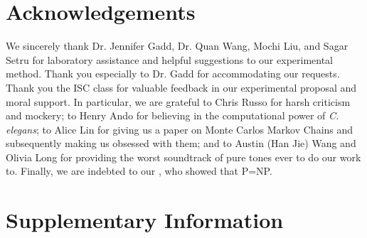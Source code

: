 \documentclass[10pt]{article}
\begin{document}
\section{Acknowledgements}

We sincerely thank Dr. Jennifer Gadd, Dr. Quan Wang, Mochi Liu, and Sagar Setru for laboratory assistance and helpful suggestions to our experimental method. Thank you especially to Dr. Gadd for accommodating our requests. Thank you the ISC class for valuable feedback in our experimental proposal and moral support. In particular, we are grateful to Chris Russo for harsh criticism and mockery; to Henry Ando for believing in the computational power of \textit{C. elegans}; to Alice Lin for giving us a paper on Monte Carlos Markov Chains and subsequently making us obsessed with them; and to Austin (Han Jie) Wang and Olivia Long for providing the worst soundtrack of pure tones ever to do our work to. Finally, we are indebted to our , who showed that P=NP.

\begin{comment}
\subsection{References}

You can upload a \verb|.bib| file containing your BibTeX entries, created with JabRef; or import your \href{https://www.overleaf.com/blog/184}{Mendeley}, CiteULike or Zotero library as a \verb|.bib| file. You can then cite entries from it, like this: \cite{greenwade93}. Just remember to specify a bibliography style, as well as the filename of the \verb|.bib|.

You can find a \href{https://www.overleaf.com/help/97-how-to-include-a-bibliography-using-bibtex}{video tutorial here} to learn more about BibTeX.

We hope you find Overleaf useful, and please let us know if you have any feedback using the help menu above --- or use the contact form at \url{https://www.overleaf.com/contact}!



\end{comment}

\section{Supplementary Information}
\end{document}
